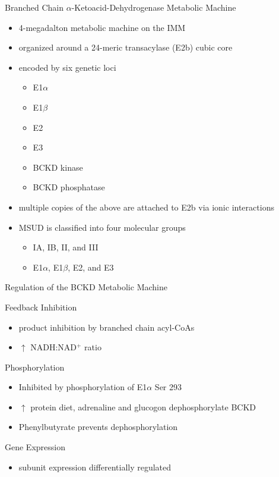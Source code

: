 \documentclass[presentation, smaller]{beamer}
\begin{document}
\begin{frame}[label={sec:orgheadline9}]{Branched Chain \(\alpha\)-Ketoacid-Dehydrogenase Metabolic Machine}
\begin{itemize}
\item 4-megadalton metabolic machine on the IMM
\item organized around a 24-meric transacylase (E2b) cubic core
\item encoded by six genetic loci
\begin{itemize}
\item E1\(\alpha\)
\item E1\(\beta\)
\item E2
\item E3
\item BCKD kinase
\item BCKD phosphatase
\end{itemize}
\item multiple copies of the above are attached to E2b via ionic interactions
\item MSUD is classified into four molecular groups
\begin{itemize}
\item IA, IB, II, and III
\item E1\(\alpha\), E1\(\beta\), E2, and E3
\end{itemize}
\end{itemize}
\end{frame}

\begin{frame}[label={sec:orgheadline10}]{Regulation of the BCKD Metabolic Machine}
\begin{block}{Feedback Inhibition}
\begin{itemize}
\item product inhibition by branched chain acyl-CoAs
\item \(\uparrow\) NADH:NAD\(^{\text{+}}\) ratio
\end{itemize}
\end{block}
\begin{block}{Phosphorylation}
\begin{itemize}
\item Inhibited by phosphorylation of E1\(\alpha\) Ser 293
\item \(\uparrow\) protein diet, adrenaline and glucogon dephosphorylate BCKD
\item Phenylbutyrate prevents dephosphorylation
\end{itemize}
\end{block}
\begin{block}{Gene Expression}
\begin{itemize}
\item subunit expression differentially regulated
\end{itemize}
\end{block}
\end{frame}
\end{document}
